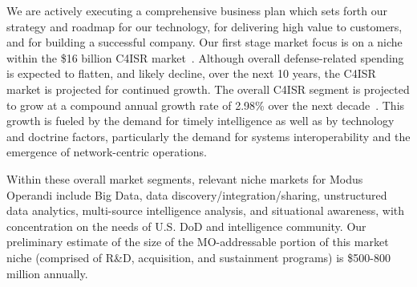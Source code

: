 \documentclass{sbir}
\begin{document}
We are actively executing a comprehensive business plan which sets forth our strategy and roadmap for our technology, for delivering high value to customers, and for building a successful company. Our first stage market focus is on a niche within the \$16 billion C4ISR market~\cite{iCD:12}. Although overall defense-related spending is expected to flatten, and likely decline, over the next 10 years, the C4ISR market is projected for continued growth. The overall C4ISR segment is projected to grow at a compound annual growth rate of 2.98\% over the next decade~\cite{iCD:12}. This growth is fueled by the demand for timely intelligence as well as by technology and doctrine factors, particularly the demand for systems interoperability and the emergence of network-centric operations.

Within these overall market segments, relevant niche markets for Modus Operandi include Big Data, data discovery/integration/sharing, unstructured data analytics, multi-source intelligence analysis, and situational awareness, with concentration on the needs of U.S. DoD and intelligence community. Our preliminary estimate of the size of the MO-addressable portion of this market niche (comprised of R\&D, acquisition, and sustainment programs) is \$500-800 million annually.
\end{document}
